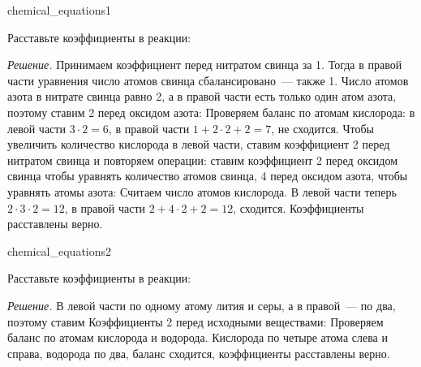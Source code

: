 \begin{example}{}{chemical_equations1}
    \begin{condition}
        Расставьте коэффициенты в реакции:
    \end{condition}

    \medskip

    \textit{Решение.} Принимаем коэффициент перед нитратом свинца за 1. Тогда в правой части уравнения число атомов свинца сбалансировано~--- также 1. Число атомов азота в нитрате свинца равно 2, а в правой части есть только один атом азота, поэтому ставим 2 перед оксидом азота:
    Проверяем баланс по атомам кислорода: в левой части $3 \cdot 2 = 6$, в правой части $1 + 2 \cdot 2 + 2 = 7$, не сходится. Чтобы увеличить количество кислорода в левой части, ставим коэффициент 2 перед нитратом свинца и повторяем операции: ставим коэффициент 2 перед оксидом свинца чтобы уравнять количество атомов свинца, 4 перед оксидом азота, чтобы уравнять атомы азота:
    Считаем число атомов кислорода. В левой части теперь $2 \cdot 3 \cdot 2 = 12$, в правой части $2 + 4 \cdot 2 + 2 = 12$, сходится. Коэффициенты расставлены верно.
\end{example}

\begin{example}{}{chemical_equations2}
    \begin{condition}
        Расставьте коэффициенты в реакции:
    \end{condition}

    \medskip

    \textit{Решение.} В левой части по одному атому лития и серы, а в правой~--- по два, поэтому ставим Коэффициенты 2 перед исходными веществами:
    Проверяем баланс по атомам кислорода и водорода. Кислорода по четыре атома слева и справа, водорода по два, баланс сходится, коэффициенты расставлены верно.
\end{example}

